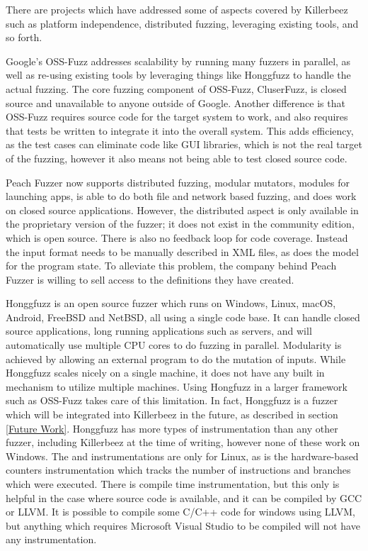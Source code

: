 There are projects which have addressed some of aspects covered by Killerbeez
such as platform independence, distributed fuzzing, leveraging existing tools,
and so forth.

Google's OSS-Fuzz\cite{ossfuzz} addresses scalability by running many fuzzers
in parallel, as well as re-using existing tools by leveraging things like
Honggfuzz to handle the actual fuzzing. The core fuzzing component of OSS-Fuzz,
CluserFuzz, is closed source and unavailable to anyone outside of Google.
Another difference is that OSS-Fuzz requires source code for the target system
to work, and also requires that tests be written to integrate it into the
overall system. This adds efficiency, as the test cases can eliminate code
like GUI libraries, which is not the real target of the fuzzing, however it
also means not being able to test closed source code.

Peach Fuzzer\cite{peach} now supports distributed fuzzing, modular mutators,
modules for launching apps, is able to do both file and network based fuzzing,
and does work on closed source applications.  However, the distributed aspect
is only available in the proprietary version of the fuzzer; it does not exist
in the community edition, which is open source. There is also no feedback loop
for code coverage.  Instead the input format needs to be manually described in
XML files, as does the model for the program state. To alleviate this problem,
the company behind Peach Fuzzer is willing to sell access to the definitions
they have created.

Honggfuzz\cite{honggfuzz} is an open source fuzzer which runs on Windows, Linux,
macOS, Android, FreeBSD and NetBSD, all using a single code base. It can handle
closed source applications, long running applications such as servers, and will
automatically use multiple CPU cores to do fuzzing in parallel. Modularity is
achieved by allowing an external program to do the mutation of inputs. While
Honggfuzz scales nicely on a single machine, it does not have any built in
mechanism to utilize multiple machines.  Using Hongfuzz in a larger framework
such as OSS-Fuzz takes care of this limitation.  In fact, Honggfuzz is a fuzzer
which will be integrated into Killerbeez in the future, as described in section
\ref{Future Work}. Honggfuzz has more types of instrumentation than any other
fuzzer, including Killerbeez at the time of writing, however none of these work
on Windows. The \BTS{} and \IPT{} instrumentations are only for Linux, as is
the hardware-based counters instrumentation which tracks the number of
instructions and branches which were executed. There is compile time
instrumentation, but this only is helpful in the case where source code is
available, and it can be compiled by GCC or LLVM.  It is possible to compile
some C/C++ code for windows using LLVM, but anything which requires Microsoft
Visual Studio to be compiled will not have any instrumentation.

